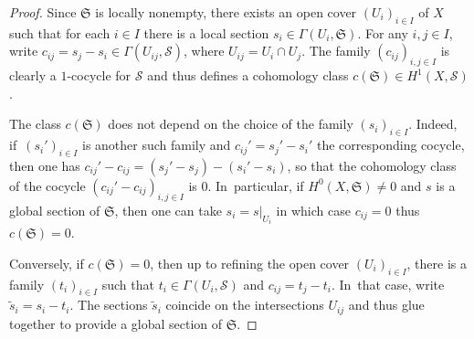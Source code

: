 \documentclass[JEP,XML,SOM,Unicode,NoEqCountersInSection,published]{cedram}
\theoremstyle{definition}
\theoremstyle{plain}
\begin{document}
\begin{proof}
Since $\mathfrak S$ is locally nonempty, there exists an open cover $(U_i)_{i \in I}$ of $X$ such that for each $i \in I$ there is a local section $s_i \in \Gamma\left(U_i, \mathfrak S\right)$.
For any $i, j \in I$, write $c_{ij} = s_j-s_i \in \Gamma\left(U_{ij}, \mathcal S\right)$, where $U_{ij} = U_i \cap U_j$.
The family $\left(c_{ij}\right)_{i, j \in I}$ is clearly a $1$-cocycle for $\mathcal S$ and thus defines a cohomology class $c(\mathfrak S) \in H^1(X, \mathcal S)$.

The class $c(\mathfrak S)$ does not depend on the choice of the family $\left(s_i\right)_{i \in I}$.
Indeed, if~$\left(s_i'\right)_{i \in I}$ is another such family and $c_{ij}' = s_j'-s_i'$ the corresponding cocycle, then one has \hbox{$c_{ij}' - c_{ij} = \left(s_j'-s_j\right) - \left(s_i'-s_i\right)$}, so that the cohomology class of the cocycle $\left(c_{ij}' - c_{ij}\right)_{i, j \in I}$ is $0$. In~particular, if $H^0(X, \mathfrak S) \neq 0$ and $s$ is a global section of $\mathfrak S$, then one can take $s_i = s|_{U_i}$ in which case $c_{ij} = 0$ thus $c(\mathfrak S) = 0$.

Conversely, if $c(\mathfrak S)=0$, then up to refining the open cover $(U_i)_{i \in I}$, there is a family $\left(t_i\right)_{i \in I}$ such that $t_i \in \Gamma\left(U_i, \mathcal S\right)$ and $c_{ij} = t_j-t_i$. In~that case, write $\widetilde s_i = s_i - t_i$.
The sections $\widetilde s_i$ coincide on the intersections $U_{ij}$ and thus glue together to provide a global section of $\mathfrak S$.
\end{proof}
\end{document}
